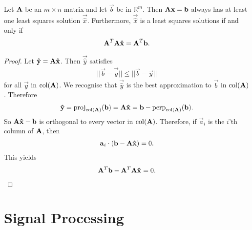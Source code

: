 \documentclass{memoir}
\begin{document}
\begin{theorem}
    Let $\mat{A}$ be an $m \times n$ matrix and let $\vec{b}$ be in $\mathbb{R}^m$. Then $\mat{A} \vec{x} = \vec{b}$ always has at least one least squares solution $\vec{\hat{x}}$. Furthermore, $\vec{\hat{x}}$ is a least squares solutions if and only if
    \begin{align*}
        \mat{A}^T \mat{A} \vec{\hat{x}} = \mat{A}^T \vec{b}.
    \end{align*}
\end{theorem}
\begin{proof}
    Let $\vec{\hat{y}}=\mat{A}\vec{\hat{x}}$. Then $\vec{\hat{y}}$ satisfies
    \begin{align*}
        ||\vec{b} - \vec{\hat{y}}|| \le ||\vec{b} - \vec{y}||
    \end{align*}
    for all $\vec{y}$ in $\col(\mat{A})$. We recognise that $\vec{\hat{y}}$ is the best approximation to $\vec{b}$ in $\col(\mat{A})$. Therefore
    \begin{align*}
        \vec{\hat{y}} = \proj_{\col(\mat{A})}(\vec{b}) = \mat{A}\vec{\hat{x}} = \vec{b} - \Perp_{\col(\mat{A})}(\vec{b}).
    \end{align*}
    So $\mat{A}\vec{\hat{x}} - \vec{b}$ is orthogonal to every vector in $\col(\mat{A})$. Therefore, if $\vec{a}_i$ is the $i$'th column of $\mat{A}$, then
    \begin{align*}
        \vec{a}_i \cdot (\vec{b} - \mat{A} \vec{\hat{x}}) = 0.
    \end{align*}
    This yields
    \begin{align*}
        \mat{A}^T \vec{b} - \mat{A}^T \mat{A} \mat{\hat{x}}=0.
    \end{align*}
\end{proof}

\section{Signal Processing}
\end{document}

